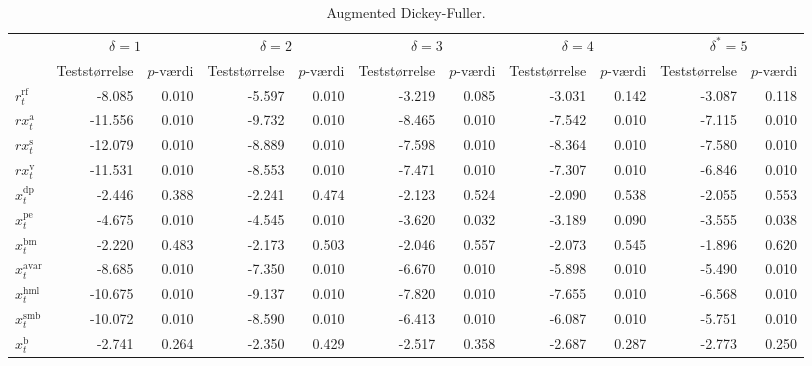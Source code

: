 \documentclass[
  a4paper,
  oneside]{memoir}
\begin{document}
\begin{landscape}
\begin{table}[!h]

\caption{\label{tab:STAT}Augmented Dickey-Fuller.}
\centering
\begin{threeparttable}
\begin{tabular}[t]{lrrrrrrrrrr}
\toprule
\multicolumn{1}{c}{ } & \multicolumn{2}{c}{$\delta=1$} & \multicolumn{2}{c}{$\delta=2$} & \multicolumn{2}{c}{$\delta=3$} & \multicolumn{2}{c}{$\delta=4$} & \multicolumn{2}{c}{$\delta^*=5$} \\
\cmidrule(l{3pt}r{3pt}){2-3} \cmidrule(l{3pt}r{3pt}){4-5} \cmidrule(l{3pt}r{3pt}){6-7} \cmidrule(l{3pt}r{3pt}){8-9} \cmidrule(l{3pt}r{3pt}){10-11}
  & Teststørrelse & $p$-værdi & Teststørrelse & $p$-værdi & Teststørrelse & $p$-værdi & Teststørrelse & $p$-værdi & Teststørrelse & $p$-værdi\\
\midrule
\rowcolor{gray!6}  $r_t^{\text{rf}}$ & -8.085 & 0.010 & -5.597 & 0.010 & -3.219 & 0.085 & -3.031 & 0.142 & -3.087 & 0.118\\
$rx_t^{\text{a}}$ & -11.556 & 0.010 & -9.732 & 0.010 & -8.465 & 0.010 & -7.542 & 0.010 & -7.115 & 0.010\\
\rowcolor{gray!6}  $rx_t^{\text{s}}$ & -12.079 & 0.010 & -8.889 & 0.010 & -7.598 & 0.010 & -8.364 & 0.010 & -7.580 & 0.010\\
$rx_t^{\text{v}}$ & -11.531 & 0.010 & -8.553 & 0.010 & -7.471 & 0.010 & -7.307 & 0.010 & -6.846 & 0.010\\
\rowcolor{gray!6}  $x_t^{\text{dp}}$ & -2.446 & 0.388 & -2.241 & 0.474 & -2.123 & 0.524 & -2.090 & 0.538 & -2.055 & 0.553\\
$x_t^{\text{pe}}$ & -4.675 & 0.010 & -4.545 & 0.010 & -3.620 & 0.032 & -3.189 & 0.090 & -3.555 & 0.038\\
\rowcolor{gray!6}  $x_t^{\text{bm}}$ & -2.220 & 0.483 & -2.173 & 0.503 & -2.046 & 0.557 & -2.073 & 0.545 & -1.896 & 0.620\\
$x_t^{\text{avar}}$ & -8.685 & 0.010 & -7.350 & 0.010 & -6.670 & 0.010 & -5.898 & 0.010 & -5.490 & 0.010\\
\rowcolor{gray!6}  $x_t^{\text{hml}}$ & -10.675 & 0.010 & -9.137 & 0.010 & -7.820 & 0.010 & -7.655 & 0.010 & -6.568 & 0.010\\
$x_t^{\text{smb}}$ & -10.072 & 0.010 & -8.590 & 0.010 & -6.413 & 0.010 & -6.087 & 0.010 & -5.751 & 0.010\\
\rowcolor{gray!6}  $x_t^{\text{b}}$ & -2.741 & 0.264 & -2.350 & 0.429 & -2.517 & 0.358 & -2.687 & 0.287 & -2.773 & 0.250\\

\end{tabular}
\end{threeparttable}
\end{table}
\end{landscape}
\end{document}
